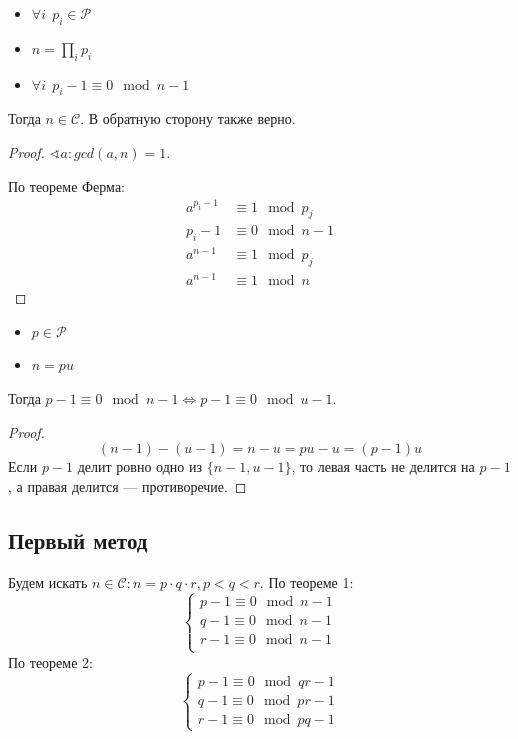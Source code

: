 \begin{theorem}\itemfix
    \begin{itemize}
        \item \(\forall i \ \ p_i \in \mathcal{P}\)
        \item \(n = \prod_i p_i\)
        \item \(\forall i \ \ p_i - 1 \equiv 0 \mod n - 1\)
    \end{itemize}
    Тогда \(n \in \mathcal{C}\). В обратную сторону также верно.
\end{theorem}
\begin{proof}
    \(\sphericalangle a : gcd(a, n) = 1\).

    По теореме Ферма:
    \begin{align*}
        a^{p_i - 1} & \equiv 1 \mod p_j   \\
        p_i - 1     & \equiv 0 \mod n - 1 \\
        a^{n - 1}   & \equiv 1 \mod p_j   \\
        a^{n - 1}   & \equiv 1 \mod n
    \end{align*}
\end{proof}

\begin{theorem}\itemfix
    \begin{itemize}
        \item \(p \in \mathcal{P}\)
        \item \(n = pu\)
    \end{itemize}

    Тогда \(p - 1 \equiv 0 \mod n - 1 \Leftrightarrow p - 1 \equiv 0 \mod u - 1\).
\end{theorem}
\begin{proof}
    \[(n - 1) - (u - 1) = n - u = pu - u = (p - 1)u\]
    Если \(p - 1\) делит ровно одно из \(\{n - 1, u - 1\}\), то левая часть не делится на \(p - 1\), а правая делится --- противоречие.
\end{proof}

\subsection{Первый метод}

Будем искать \(n \in \mathcal{C} : n = p \cdot q \cdot r, p < q < r\). По теореме 1:
\[\begin{cases}
        p - 1 \equiv 0 \mod n - 1 \\
        q - 1 \equiv 0 \mod n - 1 \\
        r - 1 \equiv 0 \mod n - 1 \\
    \end{cases}\]
По теореме 2:
\begin{equation}
    \begin{cases}
        p - 1 \equiv 0 \mod qr - 1 \\
        q - 1 \equiv 0 \mod pr - 1 \\
        r - 1 \equiv 0 \mod pq - 1
    \end{cases}
    \label{база}
\end{equation}


